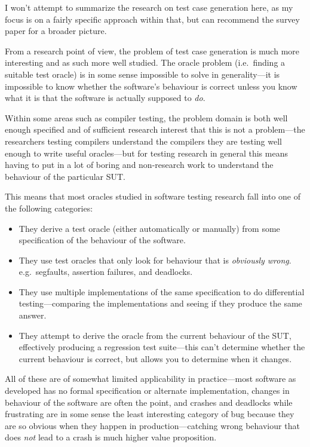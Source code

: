 I won't attempt to summarize the research on test case generation here,
as my focus is on a fairly specific approach within that,
but can recommend the survey paper for a broader picture.

From a research point of view,
the problem of test case generation is much more interesting and as such more well studied.
The oracle problem (i.e.\ finding a suitable test oracle) is in some sense impossible to solve in generality---it
is impossible to know whether the software's behaviour is correct unless you know what it is that the software is actually supposed to \emph{do}.

Within some areas such as compiler testing\cite{DBLP:conf/pldi/YangCER11, DBLP:conf/icse/DonaldsonL16},
the problem domain is both well enough specified and of sufficient research interest that this is not a problem---the
researchers testing compilers understand the compilers they are testing well enough to write useful oracles---but
for testing research in general this means having to put in a lot of boring and non-research work to understand the behaviour of the particular SUT.\ 

This means that most oracles studied in software testing research fall into one of the following categories:

\begin{itemize}
\item They derive a test oracle (either automatically or manually) from some specification of the behaviour of the software.
\item They use test oracles that only look for behaviour that is \emph{obviously wrong}.
e.g.\ segfaults, assertion failures, and deadlocks.
\item They use multiple implementations of the same specification to do differential testing---comparing
the implementations and seeing if they produce the same answer.
\item They attempt to derive the oracle from the current behaviour of the SUT,
effectively producing a regression test suite---this
can't determine whether the current behaviour is correct,
but allows you to determine when it changes.
\end{itemize}

All of these are of somewhat limited applicability in practice---most
software as developed has no formal specification or alternate implementation,
changes in behaviour of the software are often the point,
and crashes and deadlocks while frustrating are in some sense the least interesting category of bug because they are so obvious when they happen in production---catching
wrong behaviour that does \emph{not} lead to a crash is much higher value proposition.

